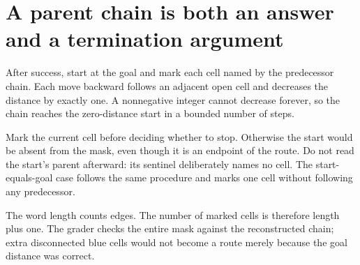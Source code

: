\section{A parent chain is both an answer and a termination argument}\label{maze-p10}

After success, start at the goal and mark each cell named by the predecessor chain. Each move backward follows an adjacent open cell and decreases the distance by exactly one. A nonnegative integer cannot decrease forever, so the chain reaches the zero-distance start in a bounded number of steps.

Mark the current cell before deciding whether to stop. Otherwise the start would be absent from the mask, even though it is an endpoint of the route. Do not read the start's parent afterward: its sentinel deliberately names no cell. The start-equals-goal case follows the same procedure and marks one cell without following any predecessor.

The word length counts edges. The number of marked cells is therefore length plus one. The grader checks the entire mask against the reconstructed chain; extra disconnected blue cells would not become a route merely because the goal distance was correct.
